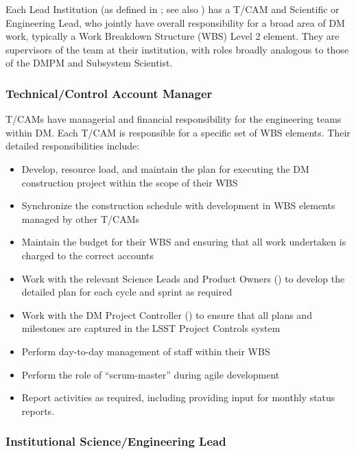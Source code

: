 Each Lead Institution (as defined in ; see also ) has a \gls{T/CAM} and Scientific or Engineering Lead, who jointly have overall responsibility for a broad area of \gls{DM} work, typically a \gls{Work Breakdown Structure} (\gls{WBS}) Level 2 element. They are supervisors of the team at their institution, with roles broadly analogous to those of the \gls{DMPM} and \gls{Subsystem Scientist}.

\subsubsection{Technical/Control Account Manager} \label{role:tcam}

\glspl{T/CAM} have managerial and financial responsibility for the engineering teams within \gls{DM}.
Each \gls{T/CAM} is responsible for a specific set of \gls{WBS} elements.
Their detailed responsibilities include:

\begin{itemize}

  \item{Develop, resource load, and maintain the plan for executing the \gls{DM} construction project within the scope of their WBS}
  \item{Synchronize the construction schedule with development in \gls{WBS} elements managed by other T/CAMs}
  \item{Maintain the budget for their \gls{WBS} and ensuring that all work undertaken is charged to the correct accounts}
  \item{Work with the relevant Science Leads and Product Owners () to develop the detailed plan for each cycle and sprint as required}
  \item{Work with the \gls{DM} Project Controller () to ensure that all plans and milestones are captured in the \gls{LSST} Project Controls system}
  \item{Perform day-to-day management of staff within their \gls{WBS}}
  \item{Perform the role of ``scrum-master'' during agile development}
  \item{Report activities as required, including providing input for monthly status reports.}

\end{itemize}

\subsubsection{Institutional Science/Engineering Lead \label{role:scilead}}

